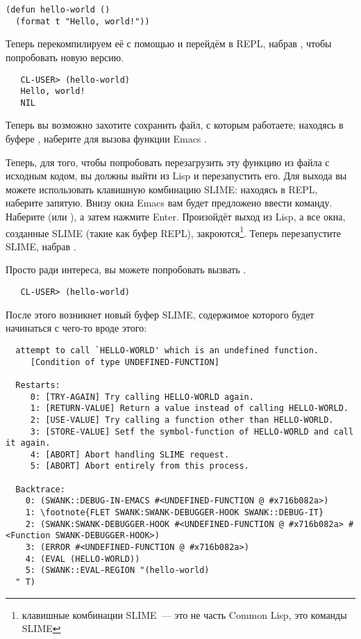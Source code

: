 \begin{lstlisting}
(defun hello-world ()
  (format t "Hello, world!"))
\end{lstlisting}

Теперь перекомпилируем её с помощью  и перейдём в REPL, набрав , чтобы
попробовать новую версию.

\begin{verbatim}
   CL-USER> (hello-world)
   Hello, world!
   NIL
\end{verbatim}

Теперь вы возможно захотите сохранить файл, с которым работаете; находясь в буфере
, наберите  для вызова функции Emacs .

Теперь, для того, чтобы попробовать перезагрузить эту функцию из файла с исходным кодом,
вы должны выйти из Lisp и перезапустить его. Для выхода вы можете использовать клавишную
комбинацию SLIME: находясь в REPL, наберите запятую. Внизу окна Emacs вам будет предложено
ввести команду. Наберите  (или ), а затем нажмите Enter. Произойдёт выход из
Lisp, а все окна, созданные SLIME (такие как буфер REPL), закроются\footnote{клавишные
  комбинации SLIME~--- это не часть Common Lisp, это команды SLIME}. Теперь перезапустите
SLIME, набрав .

Просто ради интереса, вы можете попробовать вызвать .

\begin{verbatim}
   CL-USER> (hello-world)
\end{verbatim}

После этого возникнет новый буфер SLIME, содержимое которого будет начинаться с чего-то
вроде этого:

\begin{verbatim}
  attempt to call `HELLO-WORLD' which is an undefined function.
     [Condition of type UNDEFINED-FUNCTION]
  
  Restarts:
     0: [TRY-AGAIN] Try calling HELLO-WORLD again.
     1: [RETURN-VALUE] Return a value instead of calling HELLO-WORLD.
     2: [USE-VALUE] Try calling a function other than HELLO-WORLD.
     3: [STORE-VALUE] Setf the symbol-function of HELLO-WORLD and call it again.
     4: [ABORT] Abort handling SLIME request.
     5: [ABORT] Abort entirely from this process.
  
  Backtrace:
    0: (SWANK::DEBUG-IN-EMACS #<UNDEFINED-FUNCTION @ #x716b082a>)
    1: \footnote{FLET SWANK:SWANK-DEBUGGER-HOOK SWANK::DEBUG-IT}
    2: (SWANK:SWANK-DEBUGGER-HOOK #<UNDEFINED-FUNCTION @ #x716b082a> #<Function SWANK-DEBUGGER-HOOK>)
    3: (ERROR #<UNDEFINED-FUNCTION @ #x716b082a>)
    4: (EVAL (HELLO-WORLD))
    5: (SWANK::EVAL-REGION "(hello-world)
  " T)
\end{verbatim}

